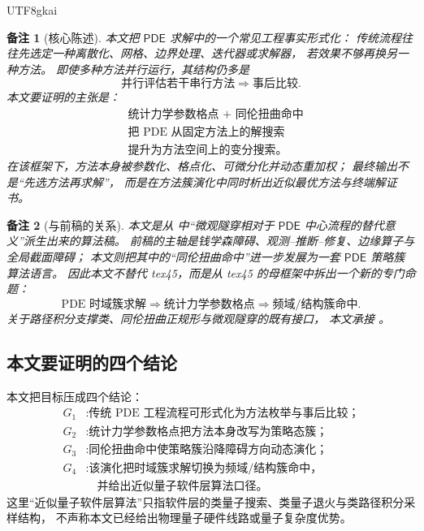 \documentclass[12pt]{article}
\newtheorem{remark}{备注}[section]
\newcommand{\PDE}{\mathsf{PDE}}
\begin{document}
\begin{CJK*}{UTF8}{gkai}
\begin{remark}[核心陈述]
本文把 \(\PDE\) 求解中的一个常见工程事实形式化：
传统流程往往先选定一种离散化、网格、边界处理、迭代器或求解器，
若效果不够再换另一种方法。
即使多种方法并行运行，其结构仍多是
\[
  \text{并行评估若干串行方法}
  \Longrightarrow
  \text{事后比较}.
\]
本文要证明的主张是：
\[
  \boxed{
    \begin{aligned}
      &\text{统计力学参数格点 + 同伦扭曲命中}\\
      &\text{把 PDE 从固定方法上的解搜索}\\
      &\text{提升为方法空间上的变分搜索。}
    \end{aligned}
  }
\]
在该框架下，方法本身被参数化、格点化、可微分化并动态重加权；
最终输出不是“先选方法再求解”，
而是在方法簇演化中同时析出近似最优方法与终端解证书。
\end{remark}

\begin{remark}[与前稿的关系]
本文是从 \cite{RepoTex45QianObstruction} 中“微观隧穿相对于 \(\PDE\) 中心流程的替代意义”派生出来的算法稿。
前稿的主轴是钱学森障碍、观测--推断--修复、边缘算子与全局截面障碍；
本文则把其中的“同伦扭曲命中”进一步发展为一套 \(\PDE\) 策略簇算法语言。
因此本文不替代 tex45，而是从 tex45 的母框架中拆出一个新的专门命题：
\[
  \text{PDE 时域簇求解}
  \Longrightarrow
  \text{统计力学参数格点}
  \Longrightarrow
  \text{频域/结构簇命中}.
\]
关于路径积分支撑类、同伦扭曲正规形与微观隧穿的既有接口，
本文承接 \cite{RepoTex36HomotopyTwist,RepoTex37SemanticGauge,RepoTex39OpenRepair}。
\end{remark}

\subsection{本文要证明的四个结论}
\label{subsec:tex53-goals}

本文把目标压成四个结论：
\[
\begin{aligned}
  G_1 &: \text{传统 PDE 工程流程可形式化为方法枚举与事后比较；}\\
  G_2 &: \text{统计力学参数格点把方法本身改写为策略态簇；}\\
  G_3 &: \text{同伦扭曲命中使策略簇沿降障碍方向动态演化；}\\
  G_4 &: \text{该演化把时域簇求解切换为频域/结构簇命中，}\\
      &\quad \text{并给出近似量子软件层算法口径。}
\end{aligned}
\]
这里“近似量子软件层算法”只指软件层的类量子搜索、类量子退火与类路径积分采样结构，
不声称本文已经给出物理量子硬件线路或量子复杂度优势。


\end{CJK*}
\end{document}
